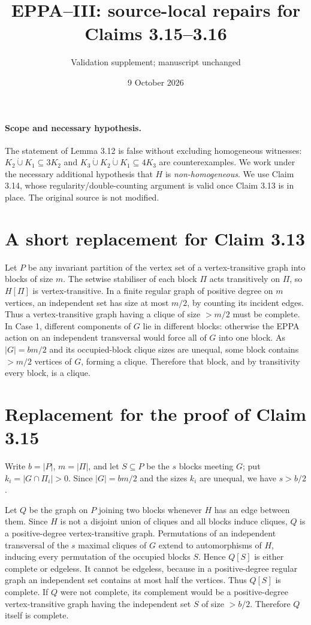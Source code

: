\documentclass[11pt,a4paper]{article}
\title{EPPA--III: source-local repairs for Claims 3.15--3.16}
\author{Validation supplement; manuscript unchanged}
\date{9 October 2026}
\begin{document}
\maketitle

\paragraph{Scope and necessary hypothesis.}
The statement of Lemma 3.12 is false without excluding homogeneous
witnesses: \(K_2\dot\cup K_1\subseteq 3K_2\) and
\(K_3\dot\cup K_2\dot\cup K_1\subseteq4K_3\) are counterexamples.
We work under the necessary additional hypothesis that \(H\) is
\emph{non-homogeneous}. We use Claim 3.14, whose regularity/double-counting
argument is valid once Claim 3.13 is in place. The original source is
not modified.

\section*{A short replacement for Claim 3.13}
Let \(P\) be any invariant partition of the vertex set of a
vertex-transitive graph into blocks of size \(m\).
The setwise stabiliser of each block \(\Pi\) acts transitively
on \(\Pi\), so \(H[\Pi]\) is vertex-transitive.
In a finite regular graph of positive degree on \(m\) vertices,
an independent set has size at most \(m/2\), by counting its
incident edges. Thus a vertex-transitive graph having a clique
of size \(>m/2\) must be complete.
In Case 1, different components of \(G\) lie in different
blocks: otherwise the EPPA action on an independent transversal
would force all of \(G\) into one block.
As \(|G|=bm/2\) and its occupied-block clique sizes are unequal,
some block contains \(>m/2\) vertices of \(G\), forming a clique.
Therefore that block, and by transitivity every block, is a clique.

\section*{Replacement for the proof of Claim 3.15}

Write \(b=|P|\), \(m=|\Pi|\), and let \(S\subseteq P\) be the
\(s\) blocks meeting \(G\); put \(k_i=|G\cap\Pi_i|>0\).
Since \(|G|=bm/2\) and the sizes \(k_i\) are unequal,
we have \(s>b/2\).

Let \(Q\) be the graph on \(P\) joining two blocks whenever
\(H\) has an edge between them. Since \(H\) is not a disjoint
union of cliques and all blocks induce cliques, \(Q\) is
a positive-degree vertex-transitive graph.
Permutations of an independent transversal of the
\(s\) maximal cliques of \(G\) extend to automorphisms
of \(H\), inducing every permutation of the occupied
blocks \(S\). Hence \(Q[S]\) is either complete or
edgeless. It cannot be edgeless, because in a positive-degree
regular graph an independent set contains at most half
the vertices. Thus \(Q[S]\) is complete.
If \(Q\) were not complete, its complement would be
a positive-degree vertex-transitive graph having the
independent set \(S\) of size \(>b/2\). Therefore \(Q\)
itself is complete.
\end{document}
